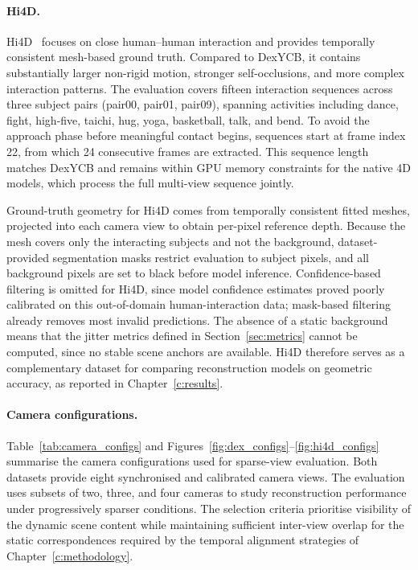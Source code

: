 \paragraph{Hi4D.}
Hi4D~\cite{hi4d} focuses on close human--human interaction and provides temporally consistent mesh-based ground truth. Compared to DexYCB, it contains substantially larger non-rigid motion, stronger self-occlusions, and more complex interaction patterns. The evaluation covers fifteen interaction sequences across three subject pairs (pair00, pair01, pair09), spanning activities including dance, fight, high-five, taichi, hug, yoga, basketball, talk, and bend. To avoid the approach phase before meaningful contact begins, sequences start at frame index 22, from which 24 consecutive frames are extracted. This sequence length matches DexYCB and remains within GPU memory constraints for the native 4D models, which process the full multi-view sequence jointly.

Ground-truth geometry for Hi4D comes from temporally consistent fitted meshes,
projected into each camera view to obtain per-pixel reference depth. Because the
mesh covers only the interacting subjects and not the background, dataset-provided
segmentation masks restrict evaluation to subject pixels, and all background
pixels are set to black before model inference. Confidence-based filtering is
omitted for Hi4D, since model confidence estimates proved poorly calibrated on
this out-of-domain human-interaction data; mask-based filtering already removes
most invalid predictions. The absence of a static background means that the
jitter metrics defined in Section~\ref{sec:metrics} cannot be computed, since no
stable scene anchors are available. Hi4D therefore serves as a complementary
dataset for comparing reconstruction models on geometric accuracy, as reported in
Chapter~\ref{c:results}.

\paragraph{Camera configurations.}
Table~\ref{tab:camera_configs} and Figures~\ref{fig:dex_configs}--\ref{fig:hi4d_configs} summarise the camera configurations used for sparse-view evaluation. Both datasets provide eight synchronised and calibrated camera views. The evaluation uses subsets of two, three, and four cameras to study reconstruction performance under progressively sparser conditions. The selection criteria prioritise visibility of the dynamic scene content while maintaining sufficient inter-view overlap for the static correspondences required by the temporal alignment strategies of Chapter~\ref{c:methodology}.

